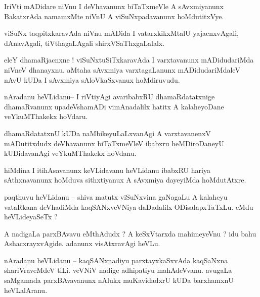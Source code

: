 \documentclass{article}
\begin{document}
\begin{mn}%
IriVti mADidare niVnu I deVhavanunx biTaTxmeVle A sAvxmiyanunx BakatxrAda namamxMte niVnU A 
viSuNxpadavanunx hoMdutitxVye.
\end{mn}

\begin{mn}%
viSuNx taqpitxkaravAda niVnu mADida I vatarxkikxMtalU yajacnxvAgali, dAnavAgali, tiVthagaLAgali 
shirxVSaThxgaLalalx.
\end{mn}

\begin{mn}%
eleY dhamaRjacnxne ! viSuNxtuSiTxkaravAda I varxtavanunx mADidudariMda niVneV dhanayxnu. aMtaha 
sAvxmiya varxtagaLanunx mADidudariMdaleV nAvU kUDa I sAvxmiya sAloVkaSxvanux hoMdiruvudu.
\end{mn}

\begin{mn}%
nAradanu heVLidanu-- I riVtiyAgi avaribabxRU dhamaRdatatxnige dhamaRvanunx upadeVshamADi 
vimAnadalilx hatitx A kalaheyoDane veYkuMThakekx hoVdaru.
\end{mn}

\begin{mn}%
dhamaRdatatxnU kUDa naMbikeyuLaLxvanAgi A varxtavanenxV mADutitxdudx deVhavanunx biTaTxmeVleV 
ibabxru heMDiroDaneyU kUDidavanAgi veYkuMThakekx hoVdanu.
\end{mn}

\begin{mn}%
hiMdina I itihAsavanunx keVLidavanu heVLidanu ibabxRU hariya sAthxnavanunx hoMduva sithxtiyanux A 
sAvxmiya dayeyiMda hoMdutAtxre.
\end{mn}


\begin{mn}%
paqthuvu heVLidanu -- shiva matutx viSuNxvina gaNagaLu A kalaheyu vataRkana deVhadiMda 
kaqSANxveVNiya daDadalilx ODisalapxTaTxLu. eMdu heVLideyaSeTx ?
\end{mn}

\begin{mn}%
A nadigaLa parxBAvavu eMthAdudx ? A keSxVtarxda mahimeyeVnu ? idu bahu AshacxrayxvAgide. adanunx 
visAtxravAgi heVLu.
\end{mn}

\begin{mn}%
nAradanu heVLidanu -- kaqSANxnadiyu parxtayxkaSxvAda kaqSaNxna shariVraveMdeV tiLi. veVNiV nadige 
adhipatiyu mahAdeVvanu. avugaLa saMgamada parxBAvavanunx nAlukx muKavidadxrU kUDa barxhamxnU 
heVLalAranu.
\end{mn}
\end{document}
